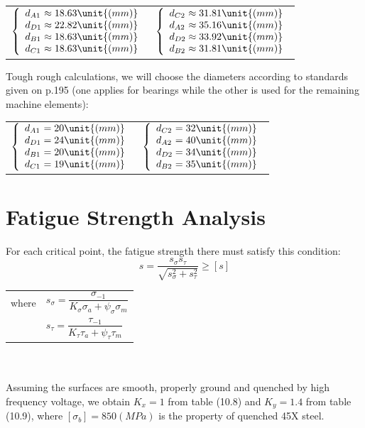 \begin{tabular}{p{7cm}p{7cm}}
		$
		\left\{ 
		\begin{array}{l@{{} \approx {}}l}
		d_{A1} & 18.63 \unit{(mm)}\\
		d_{D1} & 22.82 \unit{(mm)}\\
		d_{B1} & 18.63 \unit{(mm)}\\
		d_{C1} & 18.63 \unit{(mm)}\\
		\end{array}
		\right.
		$ &
		$
		\left\{ 
		\begin{array}{l@{{} \approx {}}l}
		d_{C2} & 31.81 \unit{(mm)}\\
		d_{A2} & 35.16 \unit{(mm)}\\
		d_{D2} & 33.92 \unit{(mm)}\\
		d_{B2} & 31.81\unit{(mm)}\\
		\end{array}
		\right.
		$
	\end{tabular}

Tough rough calculations, we will choose the diameters according to standards given on p.195 (one applies for bearings while the other is used for the remaining machine elements):

	\begin{tabular}{p{7cm}p{7cm}}
		$
		\left\{ 
		\begin{array}{l@{{} = {}}l}
		d_{A1} & 20 \unit{(mm)}\\
		d_{D1} & 24 \unit{(mm)}\\
		d_{B1} & 20 \unit{(mm)}\\
		d_{C1} & 19 \unit{(mm)}\\
		\end{array}
		\right.
		$ &
		$
		\left\{ 
		\begin{array}{l@{{} = {}}l}
		d_{C2} & 32 \unit{(mm)}\\
		d_{A2} & 40 \unit{(mm)}\\
		d_{D2} & 34 \unit{(mm)}\\
		d_{B2} & 35 \unit{(mm)}\\
		\end{array}
		\right.
		$
	\end{tabular}

\section{Fatigue Strength Analysis}
For each critical point, the fatigue strength there must satisfy this condition:
\[s=\dfrac{s_\sigma s_\tau}{\sqrt{s_\sigma^2+s_\tau^2}}\geq[s]\]
\begin{tabular}{ll}
	where & $ s_\sigma = \dfrac{\sigma_{-1}}{K_\sigma\sigma_a + \psi_\sigma\sigma_m}$\\
	& $ s_\tau = \dfrac{\tau_{-1}}{K_\tau\tau_a + \psi_\tau\tau_m}$
\end{tabular}\\\\
Assuming the surfaces are smooth, properly ground and quenched by high frequency voltage, we obtain $ K_x = 1 $ from table (10.8) and $ K_y = 1.4 $ from table (10.9), where $ [\sigma_b] = 850 \unit{(MPa)} $ is the property of quenched 45X steel.

